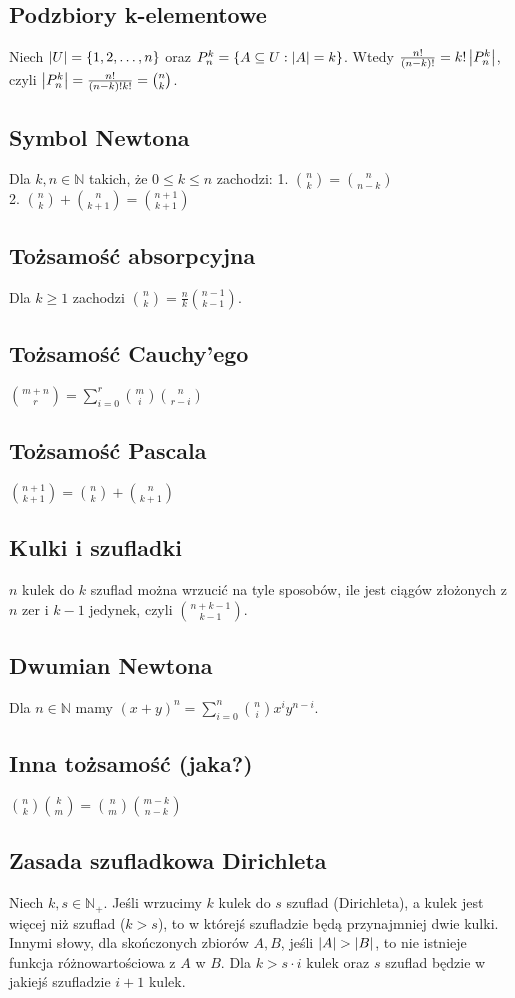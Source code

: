 \subsection*{Podzbiory k-elementowe}
Niech $\left| U \right| = \{ 1, 2, \ldots, n \}$ oraz $P_n^k = {\{ A \subseteq U : \left| A \right| = k \}}$.
Wtedy ${\frac{n!}{(n - k)!}} = {k! \left| P_n^k \right|}$, czyli 
$\left| P_n^k \right| = \frac{n!}{(n - k)! k!} = \binom{n}{k}$.

\subsection*{Symbol Newtona}
Dla $k, n \in \mathbb{N}$ takich, że $0 \leq k \leq n$ zachodzi:
1. $\binom{n}{k} = \binom{n}{n-k}$ \\
2. $\binom{n}{k} + \binom{n}{k+1} = \binom{n+1}{k+1}$

\subsection*{Tożsamość absorpcyjna}
Dla $k \geq 1$ zachodzi $\binom{n}{k} = \frac{n}{k} \binom{n-1}{k-1}$.

\subsection*{Tożsamość Cauchy'ego}
$\binom{m+n}{r} = \sum\limits_{i=0}^{r} \binom{m}{i} \binom{n}{r-i}$

\subsection*{Tożsamość Pascala}
$\binom{n+1}{k+1} = \binom{n}{k} + \binom{n}{k+1}$

\subsection*{Kulki i szufladki}
$n$ kulek do $k$ szuflad można wrzucić na tyle sposobów, ile jest ciągów złożonych
z $n$ zer i $k-1$ jedynek, czyli $\binom{n+k-1}{k-1}$.

\subsection*{Dwumian Newtona}
Dla $n \in \mathbb{N}$ mamy 
$(x+y)^n = \sum\limits_{i=0}^{n} \binom{n}{i} x^i y^{n-i}$.

\subsection*{Inna tożsamość (jaka?)}
$\binom{n}{k} \binom{k}{m} = \binom{n}{m} \binom{m-k}{n-k}$

\subsection*{Zasada szufladkowa Dirichleta}
Niech $k, s \in \mathbb{N}_+$. Jeśli wrzucimy $k$ kulek do $s$ szuflad (Dirichleta),
a kulek jest więcej niż szuflad ($k > s$), to w którejś szufladzie będą przynajmniej
dwie kulki. Innymi słowy, dla skończonych zbiorów $A, B$, jeśli $\left| A \right| > \left| B \right|$,
to nie istnieje funkcja różnowartościowa z $A$ w $B$. Dla $k > s\cdot i$ kulek oraz
$s$ szuflad będzie w jakiejś szufladzie $i + 1$ kulek.